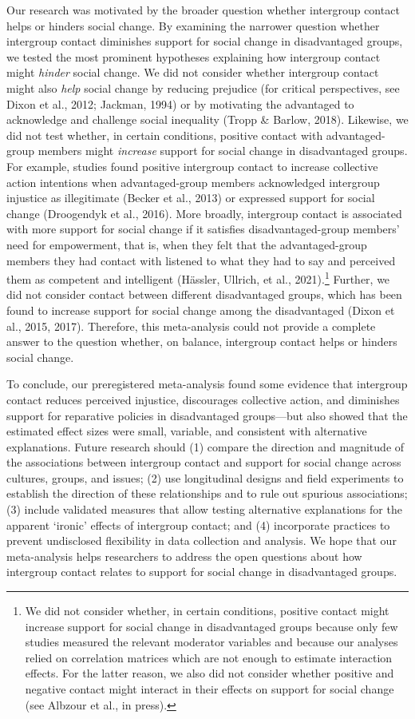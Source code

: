 \documentclass[12pt, letterpaper]{article}
\begin{document}
Our research was motivated by the broader question whether intergroup
contact helps or hinders social change. By examining the narrower
question whether intergroup contact diminishes support for social change
in disadvantaged groups, we tested the most prominent hypotheses
explaining how intergroup contact might \emph{hinder} social change. We
did not consider whether intergroup contact might also \emph{help}
social change by reducing prejudice (for critical perspectives, see
Dixon et al., 2012; Jackman, 1994) or by motivating the advantaged to
acknowledge and challenge social inequality (Tropp \& Barlow, 2018).
Likewise, we did not test whether, in certain conditions, positive
contact with advantaged-group members might \emph{increase} support for
social change in disadvantaged groups. For example, studies found
positive intergroup contact to increase collective action intentions
when advantaged-group members acknowledged intergroup injustice as
illegitimate (Becker et al., 2013) or expressed support for social
change (Droogendyk et al., 2016). More broadly, intergroup contact is
associated with more support for social change if it satisfies
disadvantaged-group members' need for empowerment, that is, when they
felt that the advantaged-group members they had contact with listened to
what they had to say and perceived them as competent and intelligent
(Hässler, Ullrich, et al., 2021).\footnote{We did not consider whether,
  in certain conditions, positive contact might increase support for
  social change in disadvantaged groups because only few studies
  measured the relevant moderator variables and because our analyses
  relied on correlation matrices which are not enough to estimate
  interaction effects. For the latter reason, we also did not consider
  whether positive and negative contact might interact in their effects
  on support for social change (see Albzour et al., in press).} Further,
we did not consider contact between different disadvantaged groups,
which has been found to increase support for social change among the
disadvantaged (Dixon et al., 2015, 2017). Therefore, this meta-analysis
could not provide a complete answer to the question whether, on balance,
intergroup contact helps or hinders social change.

To conclude, our preregistered meta-analysis found some evidence that
intergroup contact reduces perceived injustice, discourages collective
action, and diminishes support for reparative policies in disadvantaged
groups---but also showed that the estimated effect sizes were small,
variable, and consistent with alternative explanations. Future research
should (1) compare the direction and magnitude of the associations
between intergroup contact and support for social change across
cultures, groups, and issues; (2) use longitudinal designs and field
experiments to establish the direction of these relationships and to
rule out spurious associations; (3) include validated measures that
allow testing alternative explanations for the apparent `ironic' effects
of intergroup contact; and (4) incorporate practices to prevent
undisclosed flexibility in data collection and analysis. We hope that
our meta-analysis helps researchers to address the open questions about
how intergroup contact relates to support for social change in
disadvantaged groups.
\end{document}
